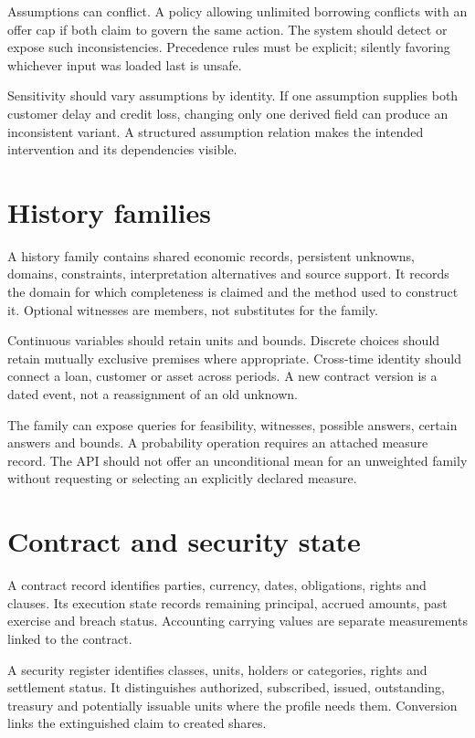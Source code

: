 Assumptions can conflict. A policy allowing unlimited borrowing conflicts with an offer cap if both claim to govern the same action. The system should detect or expose such inconsistencies. Precedence rules must be explicit; silently favoring whichever input was loaded last is unsafe.

Sensitivity should vary assumptions by identity. If one assumption supplies both customer delay and credit loss, changing only one derived field can produce an inconsistent variant. A structured assumption relation makes the intended intervention and its dependencies visible.

\section{History families}
A history family contains shared economic records, persistent unknowns, domains, constraints, interpretation alternatives and source support. It records the domain for which completeness is claimed and the method used to construct it. Optional witnesses are members, not substitutes for the family.

Continuous variables should retain units and bounds. Discrete choices should retain mutually exclusive premises where appropriate. Cross-time identity should connect a loan, customer or asset across periods. A new contract version is a dated event, not a reassignment of an old unknown.

The family can expose queries for feasibility, witnesses, possible answers, certain answers and bounds. A probability operation requires an attached measure record. The API should not offer an unconditional mean for an unweighted family without requesting or selecting an explicitly declared measure.

\section{Contract and security state}
A contract record identifies parties, currency, dates, obligations, rights and clauses. Its execution state records remaining principal, accrued amounts, past exercise and breach status. Accounting carrying values are separate measurements linked to the contract.

A security register identifies classes, units, holders or categories, rights and settlement status. It distinguishes authorized, subscribed, issued, outstanding, treasury and potentially issuable units where the profile needs them. Conversion links the extinguished claim to created shares.

